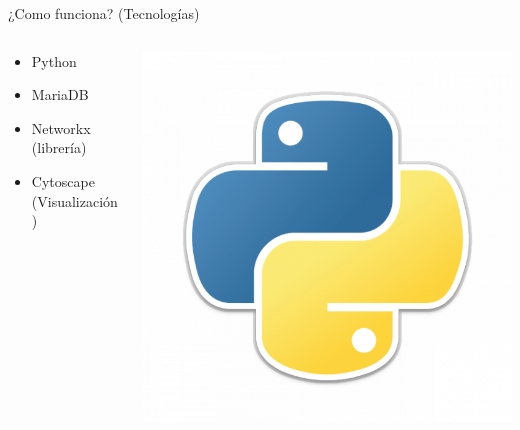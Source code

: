 \documentclass[bigger]{beamer}
\begin{document}
\begin{frame} {¿Como funciona? (Tecnologías)}
	\begin{columns}[T]
		\begin{column}[T]{6cm}
			\centering
			\vspace{1.9cm}
			\begin{itemize}
				\item Python
				\vspace{0.1cm}
				\item MariaDB
				\vspace{0.1cm}
				\item Networkx (librería)
				\vspace{0.1cm}
				\item Cytoscape (Visualización)
			\end{itemize}
		\end{column}
		\begin{column}[T]{6cm}
			\centering
			\includegraphics[scale=0.2]{img/python}

\end{column}
\end{columns}
\end{frame}
\end{document}
